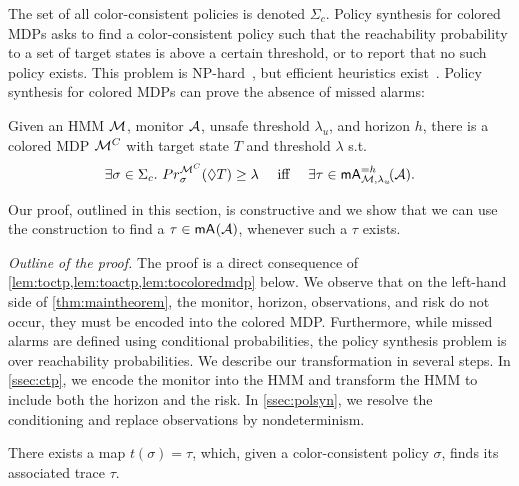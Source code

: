 \documentclass[runningheads]{llncs}
\newcommand{\missedalarms}[2]{\mathsf{mA}_{#1}^{#2}}
\newcommand{\ccSched}{\Sigma_c}
\renewcommand{\paragraph}[1]{\smallskip\noindent\emph{#1}}
\begin{document}
The set of all color-consistent policies is denoted $\ccSched$. Policy synthesis for colored MDPs asks to find a color-consistent policy such that the reachability probability to a set of target states is above a certain threshold, or to report that no such policy exists. This problem is NP-hard~\cite{DBLP:conf/aaai/ChatterjeeCD16}, but efficient heuristics exist~\cite{andriushchenkoPAYNTToolInductive2021}.
Policy synthesis for colored MDPs can prove the absence of missed alarms:
\begin{theorem}
    \label{thm:maintheorem}
    Given an HMM $\mathcal{M}$, monitor $\mathcal{A}$, unsafe threshold $\lambda_u$, and horizon $h$, there is a colored MDP $\mathcal{M}^{C}$ with target state $T$ and threshold $\lambda$ s.t.\
    \[ \exists \sigma \in \ccSched.\ \Prob^{\mdpc}_{\sigma}(\lozenge T) \geq \lambda\quad\text{ iff }\quad \exists \tau\in \missedalarms{\mc,\lambda_u}{= h}\!(\dfa).\]
\end{theorem}
Our proof, outlined in this section, is constructive and we show that we can use the construction to find a $\tau \in \missedalarms{}{}(\dfa)$, whenever such a $\tau$ exists.

\paragraph{Outline of the proof.}
The proof is a direct consequence of \cref{lem:toctp,lem:toactp,lem:tocoloredmdp} below. We observe that on the left-hand side of \cref{thm:maintheorem}, the monitor, horizon, observations, and risk do not occur, they must be encoded into the colored MDP.
Furthermore, while missed alarms are defined using conditional probabilities,  the policy synthesis problem is over reachability probabilities.
We describe our transformation in several steps. In \cref{ssec:ctp}, we encode the monitor into the HMM and transform the HMM to include both the horizon and the risk. In \cref{ssec:polsyn}, we resolve the conditioning and replace observations by nondeterminism.

\begin{corollary}
    There exists a map $t(\sigma) = \tau$, which, given a color-consistent policy $\sigma$, finds its associated trace $\tau$.
\end{corollary}
\end{document}
